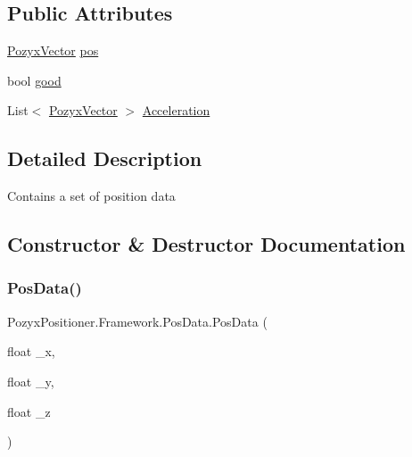 \subsection*{Public Attributes}
\begin{DoxyCompactItemize}
\item 
\hyperlink{struct_pozyx_positioner_1_1_framework_1_1_pozyx_vector}{Pozyx\+Vector} \hyperlink{struct_pozyx_positioner_1_1_framework_1_1_pos_data_a2fde856e364bb1dfcc74e654d7eef2f9}{pos}
\item 
bool \hyperlink{struct_pozyx_positioner_1_1_framework_1_1_pos_data_a4a3b04e06e199ce825d35917fe9a2edb}{good}
\item 
List$<$ \hyperlink{struct_pozyx_positioner_1_1_framework_1_1_pozyx_vector}{Pozyx\+Vector} $>$ \hyperlink{struct_pozyx_positioner_1_1_framework_1_1_pos_data_a5ad625aaf62369db8ea4cf6943f16686}{Acceleration}
\end{DoxyCompactItemize}


\subsection{Detailed Description}
Contains a set of position data 



\subsection{Constructor \& Destructor Documentation}
\mbox{\label{struct_pozyx_positioner_1_1_framework_1_1_pos_data_a3a87fee055f3468cb530c7b2cb71098f}} 
\subsubsection{\texorpdfstring{Pos\+Data()}{PosData()}\hspace{0.1cm}{\footnotesize\ttfamily [1/2]}}
{\footnotesize\ttfamily Pozyx\+Positioner.\+Framework.\+Pos\+Data.\+Pos\+Data (\begin{DoxyParamCaption}\item[{float}]{\+\_\+x,  }\item[{float}]{\+\_\+y,  }\item[{float}]{\+\_\+z }\end{DoxyParamCaption})}



